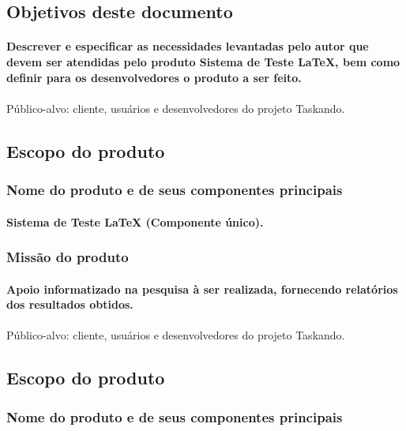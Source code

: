 \documentclass{article}
\begin{document}
	\subsection{Objetivos deste documento}
		\paragraph{Descrever e especificar as necessidades levantadas pelo autor que devem ser atendidas pelo produto Sistema de Teste LaTeX, bem como definir para os desenvolvedores o produto a ser feito.}

\paragraph{}Público-alvo: cliente, usuários e desenvolvedores do projeto Taskando.
	\subsection{Escopo do produto}
		\subsubsection{Nome do produto e de seus componentes principais}
			\paragraph{Sistema de Teste LaTeX (Componente único). }
		\subsubsection{Missão do produto}
			\paragraph{Apoio informatizado na pesquisa à ser realizada, fornecendo relatórios dos resultados obtidos.}
			
\paragraph{}Público-alvo: cliente, usuários e desenvolvedores do projeto Taskando.
	\subsection{Escopo do produto}
		\subsubsection{Nome do produto e de seus componentes principais}
\end{document}
